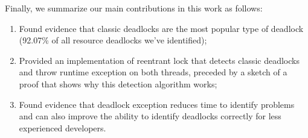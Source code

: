 Finally, we summarize our main contributions in this work as follows:
\begin{enumerate}
\item Found evidence that classic deadlocks are the most popular type of deadlock (92.07\% of all resource deadlocks we've identified);
\item Provided an implementation of reentrant lock that detects classic deadlocks and throw runtime exception on both threads, preceded by a sketch of a proof that shows why this detection algorithm works;
\item Found evidence that deadlock exception reduces time to identify problems and can also improve the ability to identify deadlocks correctly for less experienced developers.
\end{enumerate}
